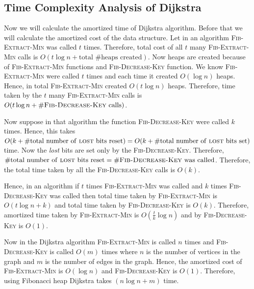 \subsection{Time Complexity Analysis of Dijkstra}

Now we will calculate the amortized time of Dijkstra algorithm. Before that we will calculate the amortized cost of the data structure. Let in an algorithm  \textsc{Fib-Extract-Min} was called $t$ times. Therefore, total cost of all $t$ many \textsc{Fib-Extract-Min} calls is $O(t\log n+\text{total $\#$heaps created})$. Now heaps are created because of \textsc{Fib-Extract-Min} functions and \textsc{Fib-Decrease-Key} function. We know \textsc{Fib-Extract-Min} were called $t$ times and each time it created $O(\log n)$ heaps. Hence, in total \textsc{Fib-Extract-Min} created $O(t\log n)$ heaps. Therefore, time taken by the $t$ many \textsc{Fib-Extract-Min} calls is $O(t\log n+\#\textsc{Fib-Decrease-Key}\text{ calls})$.

Now suppose in that algorithm the function \textsc{Fib-Decrease-Key} were called $k$ times. Hence, this takes $O(k+\#\text{total number of \textsc{lost} bits reset})=O(k+\#\text{total number of \textsc{lost} bits set})$ time. Now the \emph{lost} bits are set only by the \textsc{Fib-Decrease-Key}. Therefore, $\#\text{total number of \textsc{lost} bits reset}=\#\text{\textsc{Fib-Decrease-Key} was called}$. Therefore, the total time taken by all the \textsc{Fib-Decrease-Key} calls is $O(k)$.

Hence, in an algorithm if $t$ times \textsc{Fib-Extract-Min} was called and $k$ times \textsc{Fib-Decrease-Key} was called then total time taken by \textsc{Fib-Extract-Min} is $O(t\log n+k)$ and total time taken by \textsc{Fib-Decrease-Key} is $O(k)$. Therefore, amortized time taken by \textsc{Fib-Extract-Min} is $O(\frac{t}{k}\log n)$ and by \textsc{Fib-Decrease-Key} is $O(1)$.

Now in the Dijkstra algorithm \textsc{Fib-Extract-Min} is called $n$ times and \textsc{Fib-Decrease-Key} is called $O(m)$ times where $n$ is the number of vertices in the graph and $m$ is the number of edges in the graph. Hence, the amortized cost of \textsc{Fib-Extract-Min} is $O(\log n)$ and \textsc{Fib-Decrease-Key} is $O(1)$. Therefore, using Fibonacci heap Dijkstra takes $(n\log n+m)$ time.
